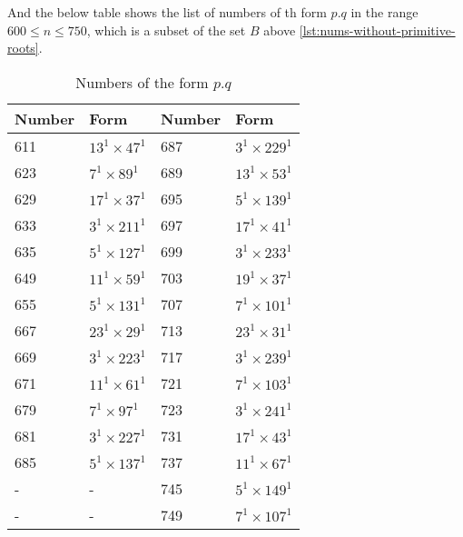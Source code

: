 \documentclass[11pt,a4paper,fleqn]{article}
\begin{document}
\begin{enumerate}[1.]
\begin{enumerate}[(a)]
\begin{flushleft}
				\medbreak
				And the below table shows the list of numbers of th form $p.q$ in the range $600 \le n \le 750$, which is a subset of the set $B$ above \ref{lst:nums-without-primitive-roots}.
				\begin{table}[H]
					\centering
					\begin{tabular}{|l|l|l|l|}
						\hline
						Number & Form & Number & Form\\ \hline
						611 & $13^1\times47^1$ & 687 & $3^1\times229^1$ \\ \hline
						623 & $7^1\times89^1$ & 689 & $13^1\times53^1$ \\ \hline
						629 & $17^1\times37^1$ & 695 & $5^1\times139^1$ \\ \hline
						633 & $3^1\times211^1$ & 697 & $17^1\times41^1$ \\ \hline
						635 & $5^1\times127^1$ & 699 & $3^1\times233^1$ \\ \hline
						649 & $11^1\times59^1$ & 703 & $19^1\times37^1$ \\ \hline
						655 & $5^1\times131^1$ & 707 & $7^1\times101^1$ \\ \hline
						667 & $23^1\times29^1$ & 713 & $23^1\times31^1$ \\ \hline
						669 & $3^1\times223^1$ & 717 & $3^1\times239^1$ \\ \hline
						671 & $11^1\times61^1$ & 721 & $7^1\times103^1$ \\ \hline
						679 & $7^1\times97^1$ & 723 & $3^1\times241^1$ \\ \hline
						681 & $3^1\times227^1$ & 731 & $17^1\times43^1$ \\ \hline
						685 & $5^1\times137^1$ & 737 & $11^1\times67^1$ \\ \hline
						-   & -                & 745 & $5^1\times149^1$ \\ \hline
						-   & -                & 749 & $7^1\times107^1$ \\ \hline
					\end{tabular}
					\caption{Numbers of the form $p.q$}
					\label{table:number-p.q-without-primitive-roots}
				\end{table}
			\end{flushleft}
			

\end{enumerate}
\end{enumerate}
\end{document}
